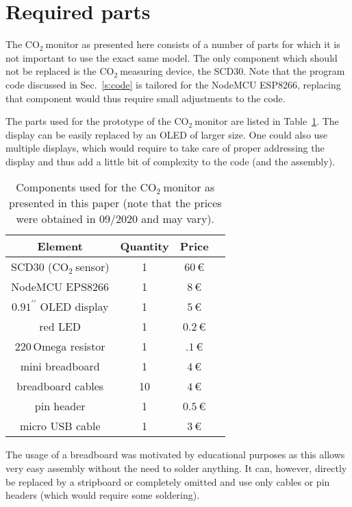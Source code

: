 \documentclass[12pt,a4paper]{article}
\newcommand{\inchsign}{^{\prime\prime}}
\newcommand{\coo}{\ensuremath{\mathrm{CO_2}~}}
\begin{document}
\section{Required parts}
The \coo monitor as presented here consists of a number of parts for which it is not important to use the exact same model. The only component which should not be replaced is the \coo measuring device, the SCD30. Note that the program code discussed in Sec.~\ref{s:code} is tailored for the NodeMCU ESP8266, replacing that component would thus require small adjustments to the code. 

The parts used for the prototype of the \coo monitor are listed in Table~\ref{t:parts}. The display can be easily replaced by an OLED of larger size. One could also use multiple displays, which would require to take care of proper addressing the display and thus add a little bit of complexity to the code (and the assembly). 
\begin{table}\label{t:parts}
\center
\begin{tabular}{cccc}\toprule
Element & Quantity & Price \\\hline
SCD30 (\coo sensor) & 1 & $60\,$\euro \\
NodeMCU EPS8266 & 1 & $8\,$\euro \\
$0.91\inchsign$ OLED display	& 1	& $5\,$\euro \\
red LED					& 1 	& $0.2\,$\euro \\
$220\,\mathrm{Omega}$ resistor	& 1	& $.1\,$\euro \\
mini breadboard		& 1 & $4\,$\euro \\
breadboard cables	& 10 & $4\,$\euro \\
pin header			& 1 & $0.5\,$\euro \\
micro USB cable		& 1 & $3\,$\euro \\
\bottomrule
\end{tabular}
\caption{Components used for the \coo monitor as presented in this paper (note that the prices were obtained in 09/2020 and may vary).}
\end{table}

The usage of a breadboard was motivated by educational purposes as this allows very easy assembly without the need to solder anything. It can, however, directly be replaced by a stripboard or completely omitted and use only cables or pin headers (which would require some soldering). 
\end{document}
